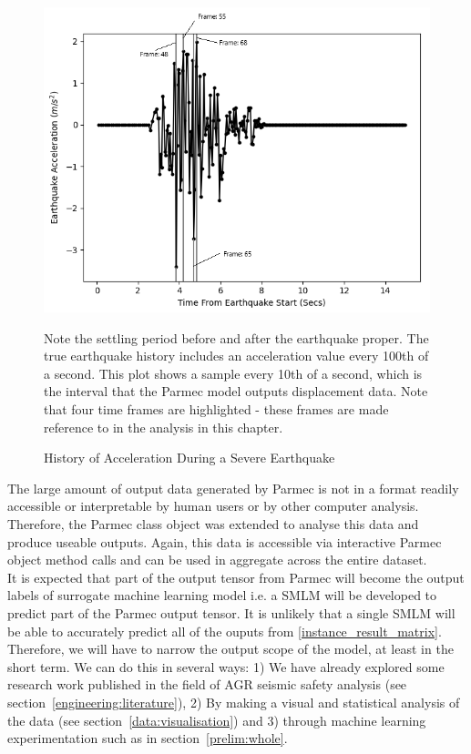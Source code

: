 \begin{figure}[ht]
	\centering
	\includegraphics[scale=0.85]{Figures/earthquake_time_points}
	\caption{History of Acceleration During a Severe Earthquake} {Note the settling period before and after the earthquake proper. The true earthquake history includes an acceleration value every 100th of a second. This plot shows a sample every 10th of a second, which is the interval that the Parmec model outputs displacement data. Note that four time frames are highlighted - these frames are made reference to in the analysis in this chapter.}
	\label{fig:earthquake}
\end{figure}

\noindent
The large amount of output data generated by Parmec is not in a format readily accessible or interpretable by human users or by other computer analysis. Therefore, the Parmec class object was extended to analyse this data and produce useable outputs. Again, this data is accessible via interactive Parmec object method calls and can be used in aggregate across the entire dataset.
\\

\noindent
It is expected that part of the output tensor from Parmec will become the output labels of surrogate machine learning model i.e. a SMLM will be developed to predict part of the Parmec output tensor. It is unlikely that a single SMLM will be able to accurately predict all of the ouputs from \ref{instance_result_matrix}. Therefore, we will have to narrow the output scope of the model, at least in the short term. We can do this in several ways: 1) We have already explored some research work published in the field of AGR seismic safety analysis (see section~\ref{engineering:literature}), 2) By making a visual and statistical analysis of the data (see section~\ref{data:visualisation})  and 3) through machine learning experimentation such as in section~\ref{prelim:whole}.


